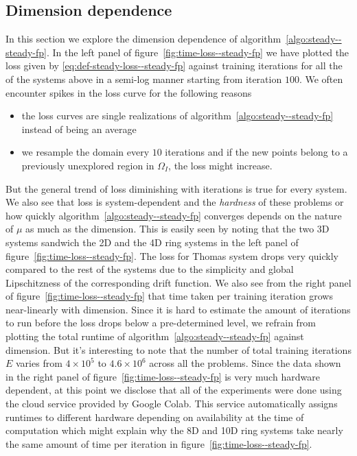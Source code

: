 \subsection{Dimension dependence} In this section we explore the dimension dependence of algorithm~\ref{algo:steady--steady-fp}.
In the left panel of figure~\ref{fig:time-loss--steady-fp} we have plotted the loss given by \eqref{eq:def-steady-loss--steady-fp} against training iterations for all the of the systems above in a semi-log manner starting from iteration $100$. We often encounter spikes in the loss curve for the following reasons
\begin{itemize}
    \item the loss curves are single realizations of algorithm~\ref{algo:steady--steady-fp} instead of being an average
    \item we resample the domain every $10$ iterations and if the new points belong to a previously unexplored region in $\Omega_I$, the loss might increase.
\end{itemize}
But the general trend of loss diminishing with iterations is true for every system. We also see that loss is system-dependent and the \textit{hardness} of these problems or how quickly algorithm~\ref{algo:steady--steady-fp} converges depends on the nature of $\mu$ as much as the dimension. This is easily seen by noting that the two 3D systems sandwich the 2D and the 4D ring systems in the left panel of figure~\ref{fig:time-loss--steady-fp}. The loss for Thomas system drops very quickly compared to the rest of the systems due to the simplicity and global Lipschitzness of the corresponding drift function. We also see from the right panel of figure~\ref{fig:time-loss--steady-fp} that time taken per training iteration grows near-linearly with dimension. Since it is hard to estimate the amount of iterations to run before the loss drops below a pre-determined level, we refrain from plotting the total runtime of algorithm~\ref{algo:steady--steady-fp} against dimension. But it's interesting to note that the number of total training iterations $E$ varies from $4\times10^5$ to $4.6\times10^6$ across all the problems. Since the data shown in the right panel of figure~\ref{fig:time-loss--steady-fp} is very much hardware dependent, at this point we disclose that all of the experiments were done using the cloud service provided by Google Colab. This service automatically assigns runtimes to different hardware depending on availability at the time of computation which might explain why the 8D and 10D ring systems take nearly the same amount of time per iteration in figure~\ref{fig:time-loss--steady-fp}.
